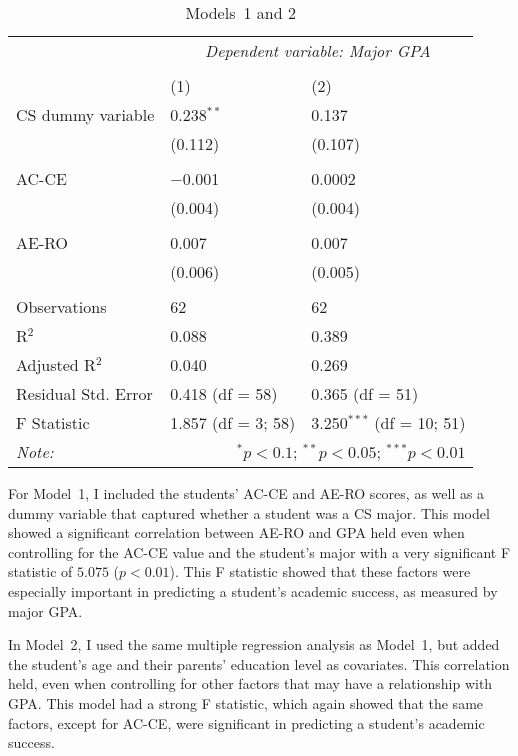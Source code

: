 \begin{table}[!htbp]
  \centering
  \caption{Models~1 and 2}
  \label{tab:models12}
  \begin{tabular}{@{\extracolsep{5pt}}lll}
  \toprule
   & \multicolumn{2}{c}{\textit{Dependent variable: Major GPA}} \\
  \cmidrule{2-3}
  \\[-1.8ex] & (1) & (2)\\
  \midrule
  CS dummy variable & 0.238$^{**}$ & 0.137 \\
    & (0.112) & (0.107) \\
    & & \\
  AC-CE & $-$0.001 & 0.0002 \\
    & (0.004) & (0.004) \\
    & & \\
  AE-RO & 0.007 & 0.007 \\
    & (0.006) & (0.005) \\
    & & \\
  \midrule
  Observations & 62 & 62 \\
  R$^{2}$ & 0.088 & 0.389 \\
  Adjusted R$^{2}$ & 0.040 & 0.269 \\
  Residual Std. Error & 0.418 (df = 58) & 0.365 (df = 51) \\
  F Statistic & 1.857 (df = 3; 58) & 3.250$^{***}$ (df = 10; 51) \\
  \bottomrule
  \textit{Note:}  & \multicolumn{2}{r}{$^{*}p<0.1$; $^{**}p<0.05$; $^{***}p<0.01$} \\
  \end{tabular}
\end{table}

For Model~1, I included the students' AC-CE and AE-RO scores, as well as a dummy variable that captured whether a student was a CS major. This model showed a significant correlation between AE-RO and GPA held even when controlling for the AC-CE value and the student's major with a very significant F statistic of $5.075$ ($p<0.01$). This F statistic showed that these factors were especially important in predicting a student's academic success, as measured by major GPA.

In Model~2, I used the same multiple regression analysis as Model~1, but added the student's age and their parents' education level as covariates. This correlation held, even when controlling for other factors that may have a relationship with GPA. This model had a strong F statistic, which again showed that the same factors, except for AC-CE, were significant in predicting a student's academic success.

